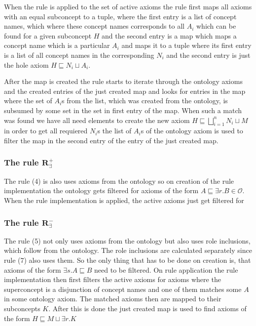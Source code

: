 \documentclass[titlepage]{article}
\begin{document}
When the rule is applied to the set of active axioms the rule first maps all axioms
with an equal subconcept to a tuple, where the first entry is a list of concept names,
which where these concept names corresponds to all $A_i$ which can be found for a given
subconcept $H$ and the second entry is a map which maps a concept name which 
is a particular $A_i$ and maps it to a tuple where its first entry is a list of all concept 
names in the corresponding $N_i$ and the second entry is just the hole axiom 
$H \sqsubseteq N_i \sqcup A_i$. 

After the map is created the rule starts to iterate 
through the ontology axioms and the created entries of the just created map and looks for
entries in the map where the set of $A_i$s from the list, which was created from the ontology,
is subsumed by some set in the set in first entry of the map.
When such a match was found we have all need elements to create the new axiom 
$H \sqsubseteq \bigsqcup^{n}_{i=1} N_i \sqcup M$ in order to get all requiered $N_i$s
the list of $A_i$s of the ontology axiom is used to filter the map in the second entry
of the entry of the just created map.

\subsubsection{The rule $\mathbf{R^+_{\exists}}$}
The rule (4) is also uses axioms from the ontology so on creation of the rule
 implementation the ontology gets filtered for axioms of the form 
 $A \sqsubseteq \exists r.B \in \mathcal{O}$. When the rule implementation is applied,
 the active axioms just get filtered for 

 \subsubsection{The rule $\mathbf{R^-_{\exists}}$}
The rule (5) not only uses axioms from the ontology but also uses role inclusions, which
follow from the ontology. The role inclusions are calculated separately since rule (7) 
also uses them. So the only thing that has to be done on creation is, that axioms of the form
$\exists s.A \sqsubseteq B$ need to be filtered.
On rule application the rule implementation then first filters the active axioms for
axioms where the superconcept is a disjunction of concept names and one of them matches
some $A$ in some ontology axiom. The matched axioms then are mapped to their subconcepts $K$.
After this is done the just created map is used to find axioms of the form 
$H \sqsubseteq M \sqcup \exists r.K$
\end{document}
